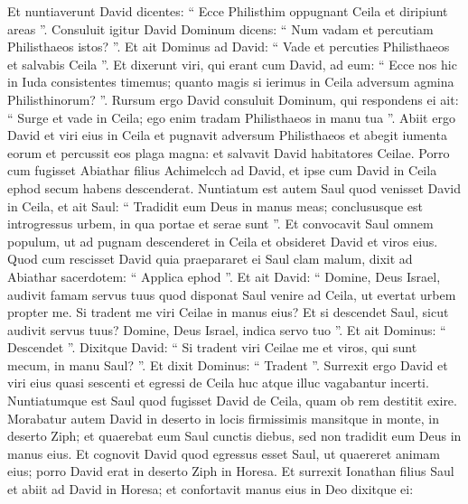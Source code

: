 \begin{biblechapter}
\begin{biblechapter}
\begin{biblechapter}
\begin{biblechapter}
\begin{biblechapter}
\begin{biblechapter}
\begin{biblechapter}
\begin{biblechapter}
\begin{biblechapter}
\begin{biblechapter}
\begin{biblechapter}
\begin{biblechapter}
\begin{biblechapter}
\begin{biblechapter}
\begin{biblechapter}
\begin{biblechapter}
\begin{biblechapter}
\begin{biblechapter}
\begin{biblechapter}
\begin{biblechapter}
\begin{biblechapter}
\begin{biblechapter}
\begin{biblechapter}
\verse Et nuntiaverunt David dicentes: “ Ecce Philisthim oppugnant Ceila et diripiunt areas ”. 
\verse Consuluit igitur David Dominum dicens: “ Num vadam et percutiam Philisthaeos istos? ”. Et ait Dominus ad David: “ Vade et percuties Philisthaeos et salvabis Ceila ”. 
\verse Et dixerunt viri, qui erant cum David, ad eum: “ Ecce nos hic in Iuda consistentes timemus; quanto magis si ierimus in Ceila adversum agmina Philisthinorum? ”. 
\verse Rursum ergo David consuluit Dominum, qui respondens ei ait: “ Surge et vade in Ceila; ego enim tradam Philisthaeos in manu tua ”. 
\verse Abiit ergo David et viri eius in Ceila et pugnavit adversum Philisthaeos et abegit iumenta eorum et percussit eos plaga magna: et salvavit David habitatores Ceilae. 
\verse Porro cum fugisset Abiathar filius Achimelcch ad David, et ipse cum David in Ceila ephod secum habens descenderat.
 \verse Nuntiatum est autem Saul quod venisset David in Ceila, et ait Saul: “ Tradidit eum Deus in manus meas; conclususque est introgressus urbem, in qua portae et serae sunt ”. 
\verse Et convocavit Saul omnem populum, ut ad pugnam descenderet in Ceila et obsideret David et viros eius. 
\verse Quod cum rescisset David quia praepararet ei Saul clam malum, dixit ad Abiathar sacerdotem: “ Applica ephod ”. 
 \verse Et ait David: “ Domine, Deus Israel, audivit famam servus tuus quod disponat Saul venire ad Ceila, ut evertat urbem propter me. 
\verse Si tradent me viri Ceilae in manus eius? Et si descendet Saul, sicut audivit servus tuus? Domine, Deus Israel, indica servo tuo ”. Et ait Dominus: “ Descendet ”. 
\verse Dixitque David: “ Si tradent viri Ceilae me et viros, qui sunt mecum, in manu Saul? ”. Et dixit Dominus: “ Tradent ”.
 \verse Surrexit ergo David et viri eius quasi sescenti et egressi de Ceila huc atque illuc vagabantur incerti. Nuntiatumque est Saul quod fugisset David de Ceila, quam ob rem destitit exire.
 \verse Morabatur autem David in deserto in locis firmissimis mansitque in monte, in deserto Ziph; et quaerebat eum Saul cunctis diebus, sed non tradidit eum Deus in manus eius. 
\verse Et cognovit David quod egressus esset Saul, ut quaereret animam eius; porro David erat in deserto Ziph in Horesa. 
\verse Et surrexit Ionathan filius Saul et abiit ad David in Horesa; et confortavit manus eius in Deo dixitque ei: 

\end{biblechapter}
\end{biblechapter}
\end{biblechapter}
\end{biblechapter}
\end{biblechapter}
\end{biblechapter}
\end{biblechapter}
\end{biblechapter}
\end{biblechapter}
\end{biblechapter}
\end{biblechapter}
\end{biblechapter}
\end{biblechapter}
\end{biblechapter}
\end{biblechapter}
\end{biblechapter}
\end{biblechapter}
\end{biblechapter}
\end{biblechapter}
\end{biblechapter}
\end{biblechapter}
\end{biblechapter}
\end{biblechapter}
